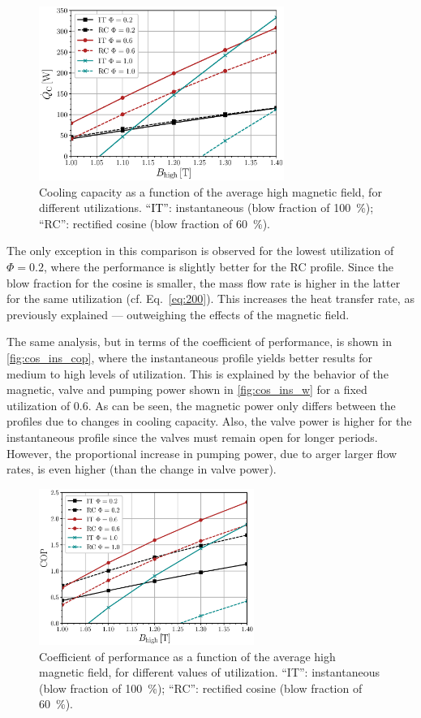 \documentclass[referee]{svjour3}
\begin{document}
\begin{figure}[!ht]
  \centering
\includegraphics[width=8cm]{Fig7-Qc_B_comp_f_1_same_minimum}
  \caption{Cooling capacity as a function of the  average high magnetic field, for different utilizations. \textcolor{black}{``IT''}: instantaneous (blow fraction of \SI{100}{\percent}); ``RC'': rectified cosine  (blow fraction of \SI{60}{\percent}).}
 \label{fig:cos_ins}
\end{figure}

The only exception in this comparison is observed for the lowest utilization of $\Phi = 0.2$, where the performance is slightly better for the RC profile. Since the blow fraction for the cosine is smaller, the mass flow rate is higher in the latter for the same utilization (cf. Eq.~\eqref{eq:200}). This increases the heat transfer rate, as previously explained ---  outweighing the effects of the magnetic field.



The same analysis, but in terms of the coefficient of performance, is shown in \autoref{fig:cos_ins_cop}, where  the instantaneous profile yields better results for medium to high levels of utilization. This is explained by the behavior of the magnetic, valve and pumping power shown in   \autoref{fig:cos_ins_w} for a fixed utilization of 0.6. As can be seen, the magnetic power only differs between the profiles due to changes in cooling capacity. Also, the valve power is higher for the instantaneous profile since the valves must remain open for longer periods. However, the proportional increase in pumping power, due to arger larger flow rates, is even higher (than the change in valve power).

\begin{figure}[!ht]
  \centering
\includegraphics[width=7cm]{Fig8-COP_B_comp_f_1_same_minimum}
  \caption{Coefficient of performance as a function of the  average high magnetic field, for different values of utilization. ``IT'': instantaneous (blow fraction of \SI{100}{\percent}); ``RC'': rectified cosine  (blow fraction of \SI{60}{\percent}).}
 \label{fig:cos_ins_cop}
\end{figure}
\end{document}
